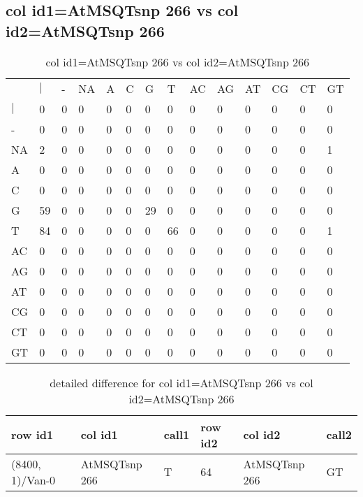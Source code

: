 \subsection{col id1=AtMSQTsnp 266 vs col id2=AtMSQTsnp 266}
\begin{center}
\begin{longtable}{|l|l|l|l|l|l|l|l|l|l|l|l|l|l|}
\caption{col id1=AtMSQTsnp 266 vs col id2=AtMSQTsnp 266} \label{table_dm608}\\
\hline
\\
\hline
&$|$&-&NA&A&C&G&T&AC&AG&AT&CG&CT&GT\\
$|$&0&0&0&0&0&0&0&0&0&0&0&0&0\\
-&0&0&0&0&0&0&0&0&0&0&0&0&0\\
NA&2&0&0&0&0&0&0&0&0&0&0&0&1\\
A&0&0&0&0&0&0&0&0&0&0&0&0&0\\
C&0&0&0&0&0&0&0&0&0&0&0&0&0\\
G&59&0&0&0&0&29&0&0&0&0&0&0&0\\
T&84&0&0&0&0&0&66&0&0&0&0&0&1\\
AC&0&0&0&0&0&0&0&0&0&0&0&0&0\\
AG&0&0&0&0&0&0&0&0&0&0&0&0&0\\
AT&0&0&0&0&0&0&0&0&0&0&0&0&0\\
CG&0&0&0&0&0&0&0&0&0&0&0&0&0\\
CT&0&0&0&0&0&0&0&0&0&0&0&0&0\\
GT&0&0&0&0&0&0&0&0&0&0&0&0&0\\
\hline
\end{longtable}
\end{center}

\begin{center}
\begin{longtable}{|l|l|l|l|l|l|}
\caption{detailed difference for col id1=AtMSQTsnp 266 vs col id2=AtMSQTsnp 266} \label{table_dm609}\\
\hline
row id1&col id1&call1&row id2&col id2&call2\\
\hline
(8400, 1)/Van-0&AtMSQTsnp 266&T&64&AtMSQTsnp 266&GT\\
\hline
\end{longtable}
\end{center}

